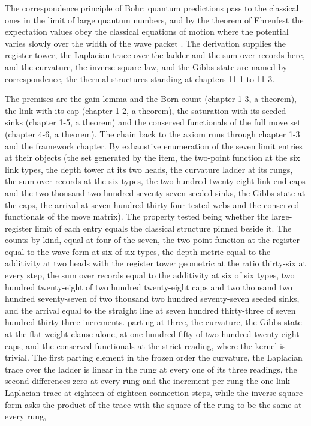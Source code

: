 \begin{chbridge}
The correspondence principle of Bohr: quantum predictions pass to the classical ones in the limit of large quantum numbers, and by the theorem of Ehrenfest the expectation values obey the classical equations of motion where the potential varies slowly over the width of the wave packet \cite{Bohr1920,Ehrenfest1927}. The derivation supplies the register tower, the Laplacian trace over the ladder and the sum over records here, and the curvature, the inverse-square law, and the Gibbs state are named by correspondence, the thermal structures standing at chapters 11-1 to 11-3.
\end{chbridge}
\begin{chproof}[census]
The premises are the gain lemma and the Born count (chapter 1-3, a theorem), the link with its cap (chapter 1-2, a theorem), the saturation with its seeded sinks (chapter 1-5, a theorem) and the conserved functionals of the full move set (chapter 4-6, a theorem). The chain back to the axiom runs through chapter 1-3 and the framework chapter. By exhaustive enumeration of the seven limit entries at their objects (the set generated by the item, the two-point function at the six link types, the depth tower at its two heads, the curvature ladder at its rungs, the sum over records at the six types, the two hundred twenty-eight link-end caps and the two thousand two hundred seventy-seven seeded sinks, the Gibbs state at the caps, the arrival at seven hundred thirty-four tested webs and the conserved functionals of the move matrix). The property tested being whether the large-register limit of each entry equals the classical structure pinned beside it. The counts by kind, equal at four of the seven, the two-point function at the register equal to the wave form at six of six types, the depth metric equal to the additivity at two heads with the register tower geometric at the ratio thirty-six at every step, the sum over records equal to the additivity at six of six types, two hundred twenty-eight of two hundred twenty-eight caps and two thousand two hundred seventy-seven of two thousand two hundred seventy-seven seeded sinks, and the arrival equal to the straight line at seven hundred thirty-three of seven hundred thirty-three increments. parting at three, the curvature, the Gibbs state at the flat-weight clause alone, at one hundred fifty of two hundred twenty-eight caps, and the conserved functionals at the strict reading, where the kernel is trivial. The first parting element in the frozen order the curvature, the Laplacian trace over the ladder is linear in the rung at every one of its three readings, the second differences zero at every rung and the increment per rung the one-link Laplacian trace at eighteen of eighteen connection steps, while the inverse-square form asks the product of the trace with the square of the rung to be the same at every rung,

\end{chproof}
